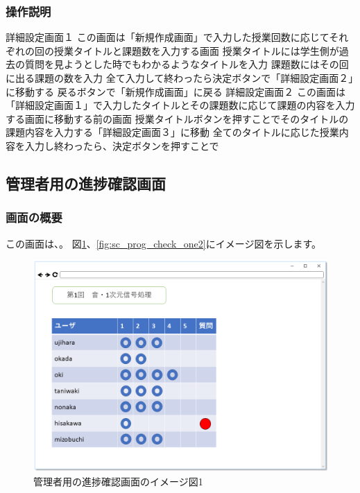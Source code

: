 \subsubsection{操作説明}
詳細設定画面１
この画面は「新規作成画面」で入力した授業回数に応じてそれぞれの回の授業タイトルと課題数を入力する画面
授業タイトルには学生側が過去の質問を見ようとした時でもわかるようなタイトルを入力
課題数にはその回に出る課題の数を入力
全て入力して終わったら決定ボタンで「詳細設定画面２」に移動する
戻るボタンで「新規作成画面」に戻る
詳細設定画面２
この画面は「詳細設定画面１」で入力したタイトルとその課題数に応じて課題の内容を入力する画面に移動する前の画面
授業タイトルボタンを押すことでそのタイトルの課題内容を入力する「詳細設定画面３」に移動
全てのタイトルに応じた授業内容を入力し終わったら、決定ボタンを押すことで

\subsection{管理者用の進捗確認画面}
\subsubsection{画面の概要}
この画面は、。
図\ref{fig:sc_prog_check_one1}、\ref{fig:sc_prog_check_one2}にイメージ図を示します。

\begin{figure}[htbp]
\begin{center}
  \includegraphics[width=1\linewidth,clip]{./img/sc_prog_check_one1.png}
  \caption{管理者用の進捗確認画面のイメージ図1}\label{fig:sc_prog_check_one1}
\end{center}
\end{figure}

